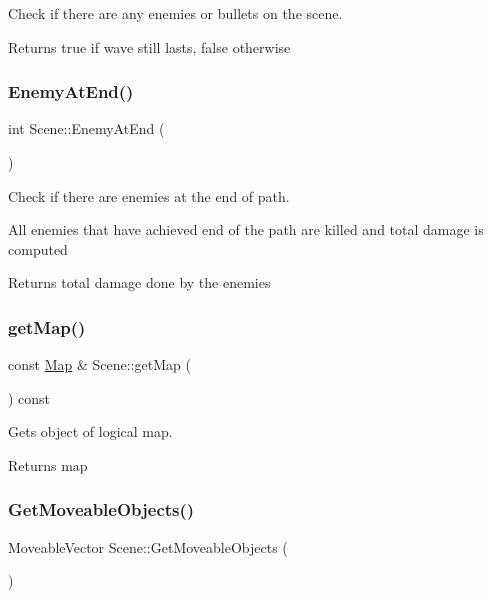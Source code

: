 Check if there are any enemies or bullets on the scene. 

\begin{DoxyReturn}{Returns}
true if wave still lasts, false otherwise 
\end{DoxyReturn}
\mbox{\label{class_scene_a59c3ff8674ae5156614afe53d2797337}} 
\subsubsection{\texorpdfstring{Enemy\+At\+End()}{EnemyAtEnd()}}
{\footnotesize\ttfamily int Scene\+::\+Enemy\+At\+End (\begin{DoxyParamCaption}{ }\end{DoxyParamCaption})}



Check if there are enemies at the end of path. 

All enemies that have achieved end of the path are killed and total damage is computed \begin{DoxyReturn}{Returns}
total damage done by the enemies 
\end{DoxyReturn}
\mbox{\label{class_scene_a63e098d10e04e864474e4949690c6f57}} 
\subsubsection{\texorpdfstring{get\+Map()}{getMap()}}
{\footnotesize\ttfamily const \mbox{\hyperlink{class_map}{Map}} \& Scene\+::get\+Map (\begin{DoxyParamCaption}{ }\end{DoxyParamCaption}) const}



Gets object of logical map. 

\begin{DoxyReturn}{Returns}
map 
\end{DoxyReturn}
\mbox{\label{class_scene_a0e995515914c7ac027c8814f3bd341da}} 
\subsubsection{\texorpdfstring{Get\+Moveable\+Objects()}{GetMoveableObjects()}}
{\footnotesize\ttfamily Moveable\+Vector Scene\+::\+Get\+Moveable\+Objects (\begin{DoxyParamCaption}{ }\end{DoxyParamCaption})}



